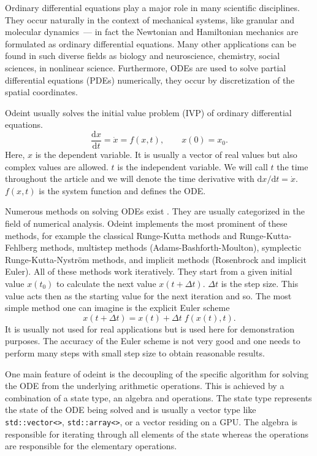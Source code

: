 \documentclass[final]{siamltex}
\newcommand{\code}[1]{\lstinline|#1|}
\newcommand {\de} {\mbox{d}}
\begin{document}
Ordinary differential equations play a major role in many scientific
disciplines. They occur naturally in the context of mechanical
systems, like granular and molecular dynamics~--- in fact the Newtonian
and Hamiltonian mechanics are formulated as ordinary differential
equations. Many other applications can be found in such diverse
fields as biology and neuroscience, chemistry, social sciences, in
nonlinear science. Furthermore, ODEs are used to solve partial
differential equations (PDEs) numerically, they occur by discretization of
the spatial coordinates.

Odeint usually solves the initial value problem (IVP) of ordinary differential
equations.
\begin{equation}
\frac{\de x}{\de t } = \dot{x} = f(x , t), \quad \quad x(0) =
x_0.
\label{eq:ode}
\end{equation}
Here, $x$ is the dependent variable. It is usually a vector of real
values but also complex values are allowed. $t$ is the independent
variable. We will call $t$ the time throughout the article and we will
denote the time derivative with $\de x / \de t = \dot{x}$. $f(x,t)$ is
the system function and defines the ODE.

Numerous methods on solving ODEs exist \cite{HairerSolvingODEI,
  HairerSolvingODEII, HairerGeometricNumericalIntegration2006}. They
are usually categorized in the field of numerical analysis. Odeint
implements the most prominent of these methods, for example the
classical Runge-Kutta methods and Runge-Kutta-Fehlberg methods,
multistep methods (Adams-Bashforth-Moulton), symplectic
Runge-Kutta-Nystr\"om methods, and implicit methods (Rosenbrock and
implicit Euler). All of these methods work iteratively. They start
from a given initial value $x(t_0)$ to calculate the next value
$x(t+\Delta t)$. $\Delta t$ is the step size. This value acts then as
the starting value for the next iteration and so. The most simple
method one can imagine is the explicit Euler scheme
\begin{equation}
x\left(t+\Delta t\right) = x(t) + \Delta t \; f(x(t),t).
\label{eq:euler}
\end{equation}
It is usually not used for real applications but is used here for
demonstration purposes. The accuracy of the Euler scheme is not very
good and one needs to perform many steps with small step size to
obtain reasonable results.


One main feature of odeint is the decoupling of the specific algorithm
for solving the ODE from the underlying arithmetic operations. This
is achieved by a combination of a state type, an algebra and
operations. The state type represents the state of the ODE being
solved and is usually a vector type like \code{std::vector<>},
\code{std::array<>}, or a vector residing on a GPU. The algebra is
responsible for iterating through all elements of the state whereas
the operations are responsible for the elementary operations.
\end{document}
